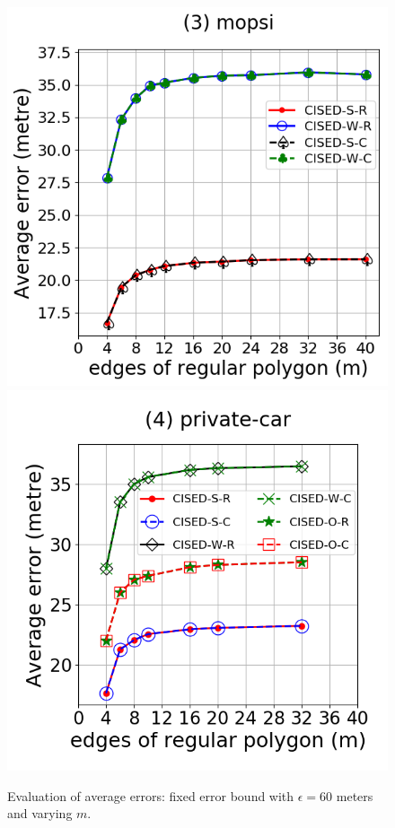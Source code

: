 \begin{figure}[tb!]
\includegraphics[scale = 0.280]{Figures/Exp-M-e-60-error-mopsi.png}
\includegraphics[scale = 0.280]{Figures/Exp-M-e-60-error-private.png}
\vspace{-1ex}
\caption{\small Evaluation of average errors: fixed error bound with $\epsilon = 60$ meters and varying $m$.}
\label{fig:m-error-e60}
\vspace{-1ex}
\end{figure}


